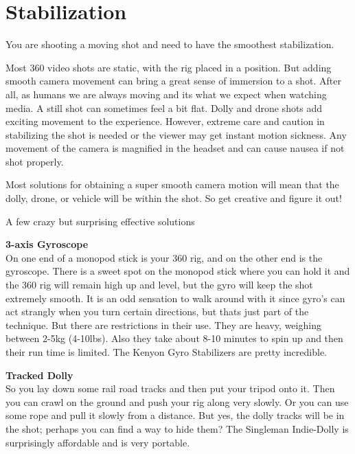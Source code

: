 \chapter{Stabilization}
\pagecolor{white}
\label{chap:24}
\begin{fullwidth}


\problem

{\large You are shooting a moving shot and need to have the smoothest stabilization. \par}

Most 360 video shots are static, with the rig placed in a position. But adding smooth camera movement can bring a great sense of immersion to a shot. After all, as humans we are always moving and its what we expect when watching media. A still shot can sometimes feel a bit flat. Dolly and drone shots add exciting movement to the experience. However, extreme care and caution in stabilizing the shot is needed or the viewer may get instant motion sickness. Any movement of the camera is magnified in the headset and can cause nausea if not shot properly.


\solution

Most solutions for obtaining a super smooth camera motion will mean that the dolly, drone, or vehicle will be within the shot. So get creative and figure it out!

{\large A few crazy but surprising effective solutions \par}
{\bf 3-axis Gyroscope}
\\
On one end of a monopod stick is your 360 rig, and on the other end is the gyroscope. There is a sweet spot on the monopod stick where you can hold it and the 360 rig will remain high up and level, but the gyro will keep the shot extremely smooth. It is an odd sensation to walk around with it since gyro's can act strangly when you turn certain directions, but thats just part of the technique. But there are restrictions in their use. They are heavy, weighing between 2-5kg (4-10lbs). Also they take about 8-10 minutes to spin up and then their run time is limited. The Kenyon Gyro Stabilizers are pretty incredible.

{\bf Tracked Dolly}
\\
So you lay down some rail road tracks and then put your tripod onto it. Then you can crawl on the ground and push your rig along very slowly. Or you can use some rope and pull it slowly from a distance. But yes, the dolly tracks will be in the shot; perhaps you can find a way to hide them? The Singleman Indie-Dolly is surprisingly affordable and is very portable. 


\end{fullwidth}
